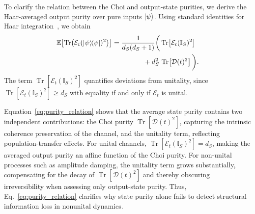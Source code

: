 \documentclass[pra,twocolumn,aps,showpacs,superscriptaddress,longbibliography]{revtex4-2}%
\begin{document}
To clarify the relation between the Choi and output-state purities, we derive the Haar-averaged output purity over pure inputs $\ket{\psi}$. Using standard identities for Haar integration~\cite{mele_2024_introduction}, we obtain
\begin{equation}\label{eq:purity_relation}
\begin{split}
\mathbb{E}\!\left[\operatorname{Tr}\!\left(\mathcal{E}_t(\dyad{\psi})^2\right)\right]
&=\frac{1}{d_S(d_S+1)}\bigg(
\operatorname{Tr}\!\left[\mathcal{E}_t(\mathbb{I}_S)^2\right] \\
&\hspace{1.6cm} + d_S^2\,\operatorname{Tr}\!\left[\mathcal{D}(t)^2\right]
\bigg).
\end{split}
\end{equation}
The term $\operatorname{Tr}[\mathcal{E}_t(\mathbb{I}_S)^2]$ quantifies deviations from unitality, since $\operatorname{Tr}[\mathcal{E}_t(\mathbb{I}_S)^2]\ge d_S$ with equality if and only if $\mathcal{E}_t$ is unital.

Equation~\eqref{eq:purity_relation} shows that the average state purity contains two independent contributions: the Choi purity $\operatorname{Tr}[\mathcal{D}(t)^2]$, capturing the intrinsic coherence preservation of the channel, and the unitality term, reflecting population-transfer effects. For unital channels, $\operatorname{Tr}[\mathcal{E}_t(\mathbb{I}_S)^2]=d_S$, making the averaged output purity an affine function of the Choi purity. For non-unital processes such as amplitude damping, the unitality term grows substantially, compensating for the decay of $\operatorname{Tr}[\mathcal{D}(t)^2]$ and thereby obscuring irreversibility when assessing only output-state purity. Thus, Eq.~\eqref{eq:purity_relation} clarifies why state purity alone fails to detect structural information loss in nonunital dynamics.
\end{document}

